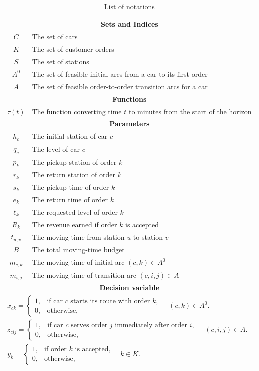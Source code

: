 \documentclass[10pt,a4paper]{article}
\begin{document}
\begin{table}[ht]
\centering
\small
\begin{tabular}{c|l}
\toprule
\multicolumn{2}{c}{\textbf{Sets and Indices}}\\
\midrule
$C$ & The set of cars\\
$K$ & The set of customer orders\\
$S$ & The set of stations\\
$A^0$ & The set of feasible initial arcs from a car to its first order\\
$A$ & The set of feasible order-to-order transition arcs for a car\\
\midrule
\multicolumn{2}{c}{\textbf{Functions}}\\
\midrule
$\tau(t)$ & The function converting time $t$ to minutes from the start of the horizon\\
\midrule
\multicolumn{2}{c}{\textbf{Parameters}}\\
\midrule
$h_c$ & The initial station of car $c$\\
$q_c$ & The level of car $c$\\
$p_k$ & The pickup station of order $k$\\
$r_k$ & The return station of order $k$\\
$s_k$ & The pickup time of order $k$\\
$e_k$ & The return time of order $k$\\
$\ell_k$ & The requested level of order $k$\\
$R_k$ & The revenue earned if order $k$ is accepted\\
$t_{u,v}$ & The moving time from station $u$ to station $v$\\
$B$ & The total moving-time budget\\
$m_{c,k}$ & The moving time of initial arc $(c,k)\in A^0$\\
$m_{i,j}$ & The moving time of transition arc $(c,i,j)\in A$\\
\midrule
\multicolumn{2}{c}{\textbf{Decision variable}}\\
\midrule
\multicolumn{2}{l}{
$x_{ck} =
\begin{cases}
1, & \text{if car } c \text{ starts its route with order } k,\\
0, & \text{otherwise,}
\end{cases}
\quad (c,k)\in A^0.$}\\[2.2em]
\multicolumn{2}{l}{
$z_{cij} =
\begin{cases}
1, & \text{if car } c \text{ serves order } j \text{ immediately after order } i,\\
0, & \text{otherwise,}
\end{cases}
\quad (c,i,j)\in A.$}\\[2.2em]
\multicolumn{2}{l}{
$y_k =
\begin{cases}
1, & \text{if order } k \text{ is accepted,}\\
0, & \text{otherwise,}
\end{cases}
\quad k\in K.$}\\
\bottomrule
\end{tabular}
\caption{List of notations}
\end{table}
\end{document}
